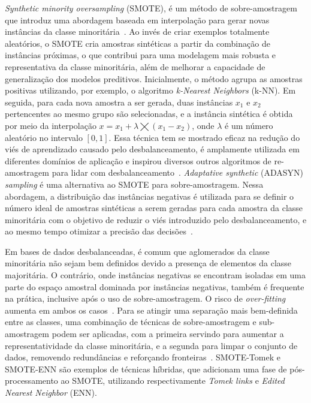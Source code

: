 \textit{Synthetic minority oversampling} (SMOTE), é um método de sobre-amostragem que introduz uma abordagem baseada em interpolação para gerar novas instâncias da classe minoritária~\cite{Wei2025}. Ao invés de criar exemplos totalmente aleatórios, o SMOTE cria amostras sintéticas a partir da combinação de instâncias próximas, o que contribui para uma modelagem mais robusta e representativa da classe minoritária, além de melhorar a capacidade de generalização dos modelos preditivos. Inicialmente, o método agrupa as amostras positivas utilizando, por exemplo, o algoritmo \textit{k-Nearest Neighbors} (k-NN). Em seguida, para cada nova amostra a ser gerada, duas instâncias \(x_{1}\) e \(x_{2}\) pertencentes ao mesmo grupo são selecionadas, e a instância sintética é obtida por meio da interpolação \(x = x_{1} + \lambda \bigtimes (x_{1} - x_{2})\), onde \(\lambda\) é um número aleatório no intervalo \([0, 1]\). Essa técnica tem se mostrado eficaz na redução do viés de aprendizado causado pelo desbalanceamento, é amplamente utilizada em diferentes domínios de aplicação e inspirou diversos outros algoritmos de re-amostragem para lidar com desbalanceamento~\cite{Fernndez2018}. \textit{Adaptative synthetic} (ADASYN) \textit{sampling} é uma alternativa ao SMOTE para sobre-amostragem. Nessa abordagem, a distribuição das instâncias negativas é utilizada para se definir o número ideal de amostras sintéticas a serem geradas para cada amostra da classe minoritária com o objetivo de reduzir o viés introduzido pelo desbalanceamento, e ao mesmo tempo otimizar a precisão das decisões~\cite{He2008}.

Em bases de dados desbalanceadas, é comum que aglomerados da classe minoritária não sejam bem definidos devido a presença de elementos da classe majoritária. O contrário, onde instâncias negativas se encontram isoladas em uma parte do espaço amostral dominada por instâncias negativas, também é frequente na prática, inclusive após o uso de sobre-amostragem. O risco de \textit{over-fitting} aumenta em ambos os casos~\cite{Batista2004}. Para se atingir uma separação mais bem-definida entre as classes, uma combinação de técnicas de sobre-amostragem e sub-amostragem podem ser aplicadas, com a primeira servindo para aumentar a representatividade da classe minoritária, e a segunda para limpar o conjunto de dados, removendo redundâncias e reforçando fronteiras~\cite{Pereira2020}. SMOTE-Tomek e SMOTE-ENN são exemplos de técnicas híbridas, que adicionam uma fase de pós-processamento ao SMOTE, utilizando respectivamente \textit{Tomek links} e \textit{Edited Nearest Neighbor} (ENN).

